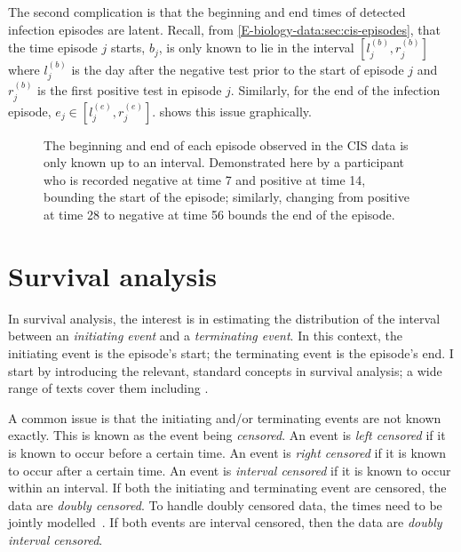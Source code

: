 \documentclass[thesis.tex]{subfiles}
\begin{document}
The second complication is that the beginning and end times of detected infection episodes are latent.
Recall, from \cref{E-biology-data:sec:cis-episodes}, that the time episode $j$ starts, $b_j$, is only known to lie in the interval $[l_j^{(b)}, r_j^{(b)}]$ where $l_j^{(b)}$ is the day after the negative test prior to the start of episode $j$ and $r_j^{(b)}$ is the first positive test in episode $j$.
Similarly, for the end of the infection episode, $e_j \in [l_j^{(e)}, r_j^{(e)}]$.
 shows this issue graphically.
\begin{figure}
  \caption[Double-interval censoring in CIS data]{%
        The beginning and end of each episode observed in the CIS data is only known up to an interval.
        Demonstrated here by a participant who is recorded negative at time 7 and positive at time 14, bounding the start of the episode; similarly, changing from positive at time 28 to negative at time 56 bounds the end of the episode.
    }
    \label{perf-test:fig:double-interval-censor}
\end{figure}

\section{Survival analysis} \label{perf-test:sec:surv-analysis}

In survival analysis, the interest is in estimating the distribution of the interval between an \emph{initiating event} and a \emph{terminating event}.
In this context, the initiating event is the episode's start; the terminating event is the episode's end.
I start by introducing the relevant, standard concepts in survival analysis; a wide range of texts cover them including \textcite[chapter 1]{bogaertsSurvival}.

A common issue is that the initiating and/or terminating events are not known exactly.
This is known as the event being \emph{censored}.
An event is \emph{left censored} if it is known to occur before a certain time.
An event is \emph{right censored} if it is known to occur after a certain time.
An event is \emph{interval censored} if it is known to occur within an interval.
If both the initiating and terminating event are censored, the data are \emph{doubly censored}.
To handle doubly censored data, the times need to be jointly modelled~\autocite[and references therein]{liSemiparametric}.
If both events are interval censored, then the data are \emph{doubly interval censored}.
\end{document}
